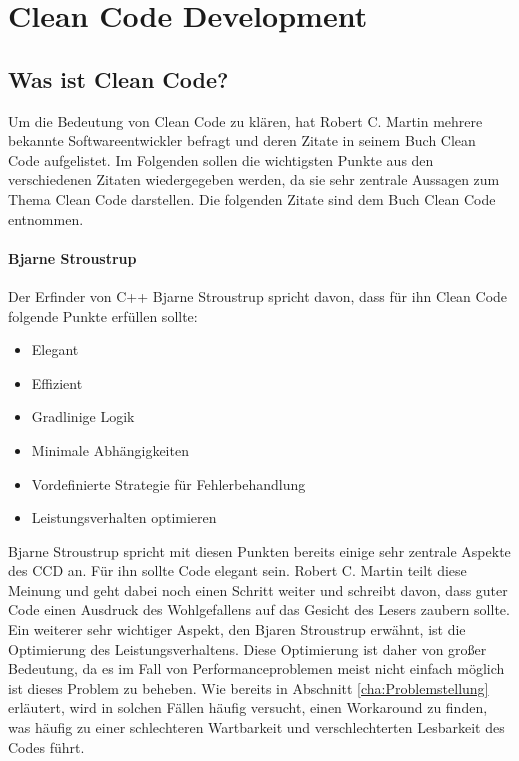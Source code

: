 \chapter{Clean Code Development}
\section{Was ist Clean Code?}
\label{cha:WhatIsCleanCode}

Um die Bedeutung von Clean Code zu klären, hat Robert C. Martin mehrere bekannte Softwareentwickler befragt und deren Zitate in seinem Buch Clean Code \cite{Martin2008} aufgelistet. Im Folgenden sollen die wichtigsten Punkte aus den verschiedenen Zitaten wiedergegeben werden, da sie sehr zentrale Aussagen zum Thema Clean Code darstellen. Die folgenden Zitate sind dem Buch Clean Code \cite{Martin2008} entnommen.

\subsubsection{Bjarne Stroustrup}
Der Erfinder von C++ Bjarne Stroustrup spricht davon, dass für ihn Clean Code folgende Punkte erfüllen sollte:

\begin{itemize}
	\item Elegant
	\item Effizient
	\item Gradlinige Logik
	\item Minimale Abhängigkeiten
	\item Vordefinierte Strategie für Fehlerbehandlung
	\item Leistungsverhalten optimieren
\end{itemize}

Bjarne Stroustrup spricht mit diesen Punkten bereits einige sehr zentrale Aspekte des CCD an. Für ihn sollte Code elegant sein. Robert C. Martin teilt diese Meinung und geht dabei noch einen Schritt weiter und schreibt davon, dass guter Code einen Ausdruck des Wohlgefallens auf das Gesicht des Lesers zaubern sollte. Ein weiterer sehr wichtiger Aspekt, den Bjaren Stroustrup erwähnt, ist die Optimierung des Leistungsverhaltens. Diese Optimierung ist daher von großer Bedeutung, da es im Fall von Performanceproblemen meist nicht einfach möglich ist dieses Problem zu beheben. Wie bereits in Abschnitt \ref{cha:Problemstellung} erläutert, wird in solchen Fällen häufig versucht, einen Workaround zu finden, was häufig zu einer schlechteren Wartbarkeit und verschlechterten Lesbarkeit des Codes führt.

